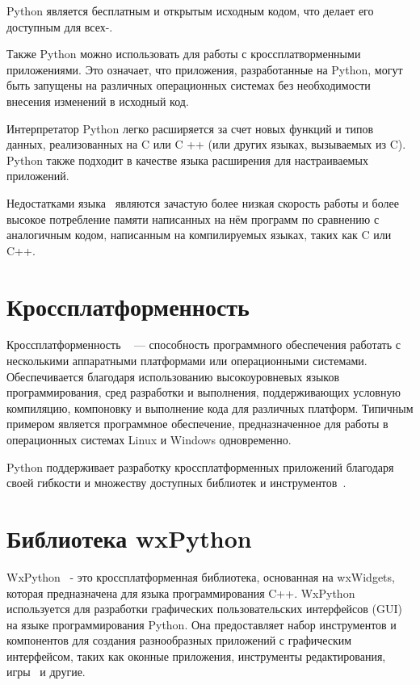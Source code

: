 Python является бесплатным и открытым исходным кодом, что делает его доступным для всех-\cite{p10}. 

Также Python можно использовать для работы с кроссплатворменными приложениями. Это означает, что приложения, разработанные на Python, могут быть запущены на различных операционных системах без необходимости внесения изменений в исходный код.

Интерпретатор Python легко расширяется за счет новых функций и типов данных, реализованных на C или C ++ (или других языках, вызываемых из C). Python также подходит в качестве языка расширения для настраиваемых приложений.

Недостатками языка~\cite{p14} являются зачастую более низкая скорость работы и более высокое потребление памяти написанных на нём программ по сравнению с аналогичным кодом, написанным на компилируемых языках, таких как C или C++.

\section{\label{sec:ch01/sec03}Кроссплатформенность}
Кроссплатформенность ~\cite{p12} --- способность программного обеспечения работать с несколькими аппаратными платформами или операционными системами. Обеспечивается благодаря использованию высокоуровневых языков программирования, сред разработки и выполнения, поддерживающих условную компиляцию, компоновку и выполнение кода для различных платформ. Типичным примером является программное обеспечение, предназначенное для работы в операционных системах Linux и Windows одновременно.

Python поддерживает разработку кроссплатформенных приложений благодаря своей гибкости и множеству доступных библиотек и инструментов~\cite{p3}.

\section{\label{sec:ch01/sec04}Библиотека wxPython}

WxPython~\cite{p1} - это кроссплатформенная библиотека, основанная на wxWidgets, которая предназначена для языка программирования C++. WxPython используется для разработки графических пользовательских интерфейсов (GUI)~\cite{p4} на языке программирования Python. Она предоставляет набор инструментов и компонентов для создания разнообразных приложений с графическим интерфейсом, таких как оконные приложения, инструменты редактирования, игры~\cite{p11} и другие.


